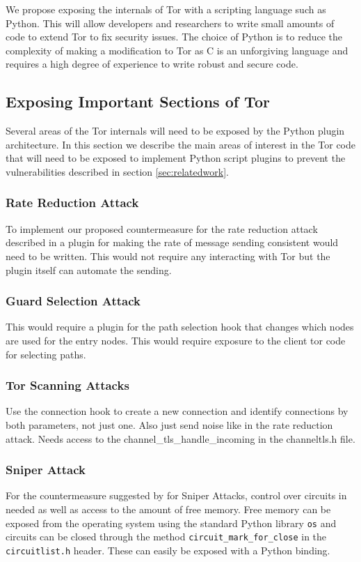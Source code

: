 \documentclass[9pt,technote]{IEEEtran}
\begin{document}
We propose exposing the internals of Tor with a scripting language such as
Python. This will allow developers and researchers to write small amounts of
code to extend Tor to fix security issues. The choice of Python is to reduce the complexity of making a modification to Tor as C is an unforgiving language and requires a high degree of experience to write robust and secure code.

\subsection{Exposing Important Sections of Tor}
Several areas of the Tor internals will need to be exposed by the Python plugin
architecture. In this section we describe the main areas of interest in the Tor
code that will need to be exposed to implement Python script plugins to prevent
the vulnerabilities described in section \ref{sec:relatedwork}.\\

\subsubsection{Rate Reduction Attack}
To implement our proposed countermeasure for the rate reduction attack described in \cite{gilad2012spying} a plugin for making the rate of message sending consistent would need to be written. This would not require any interacting with Tor but the plugin itself can automate the sending.

\subsubsection{Guard Selection Attack}
This would require a plugin for the path selection hook that changes which nodes are used for the entry nodes. This would require exposure to the client tor code for selecting paths.

\subsubsection{Tor Scanning Attacks}
Use the connection hook to create a new connection and identify connections by
both parameters, not just one. Also just send noise like in the rate reduction
attack. Needs access to the channel\_tls\_handle\_incoming in the channeltls.h file.

\subsubsection{Sniper Attack}
For the countermeasure suggested by \citeauthor{jansen2014sniper} for Sniper Attacks, control over circuits in needed as well as access to the amount of free memory. Free memory can be exposed from the operating system using the standard Python library \texttt{os} and circuits can
be closed through the method \texttt{circuit\_mark\_for\_close} in the
\texttt{circuitlist.h} header. These can easily be exposed with a Python
binding.\\
\end{document}
